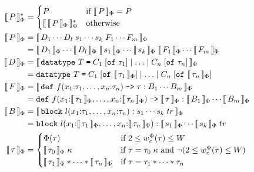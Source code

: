 \begin{figure}[htbp]
  \centering
  \footnotesize
  \setlength{\abovedisplayskip}{2pt}
  \setlength{\belowdisplayskip}{2pt}
  \setlength{\jot}{2pt}
  \[
  \begin{aligned}
    \sembrack{P}_\Phi^*
      &= \begin{cases}
           P & \text{if } \sembrack{P}_\Phi = P \\
           \sembrack{\sembrack{P}_\Phi}_\Phi^* & \text{otherwise}
         \end{cases} \\
    \sembrack{P}_\Phi
      &= \sembrack{D_1 \cdots D_l \; s_1 \cdots s_k \; F_1 \cdots F_m}_\Phi \\
      &= \sembrack{D_1}_\Phi \cdots \sembrack{D_l}_\Phi \; \sembrack{s_1}_\Phi \cdots \sembrack{s_k}_\Phi \; \sembrack{F_1}_\Phi \cdots \sembrack{F_m}_\Phi \\
    \sembrack{D}_\Phi
      &= \sembrack{\mathtt{datatype}\ T \syneq C_1\;[\mathtt{of}\ \tau_1] \mathrel{\mathtt{|}} \dots \mathrel{\mathtt{|}} C_n\;[\mathtt{of}\ \tau_n]}_\Phi \\
      &= \mathtt{datatype}\ T \syneq C_1\;[\mathtt{of}\ \sembrack{\tau_1}_\Phi] \mathrel{\mathtt{|}} \dots \mathrel{\mathtt{|}} C_n\;[\mathtt{of}\ \sembrack{\tau_n}_\Phi] \\
    \sembrack{F}_\Phi
      &= \sembrack{\mathtt{def}\ f(x_1{:}\tau_1, \dots, x_n{:}\tau_n) \mathrel{\texttt{->}} \tau : B_1 \cdots B_m}_\Phi \\
      &= \mathtt{def}\ f(x_1{:}\sembrack{\tau_1}_\Phi, \dots, x_n{:}\sembrack{\tau_n}_\Phi) \mathrel{\texttt{->}} \sembrack{\tau}_\Phi : \sembrack{B_1}_\Phi \cdots \sembrack{B_m}_\Phi \\
    \sembrack{B}_\Phi
      &= \sembrack{\mathtt{block}\ l(x_1{:}\tau_1, \dots, x_n{:}\tau_n) : s_1 \cdots s_k \; tr}_\Phi \\
      &= \mathtt{block}\ l(x_1{:}\sembrack{\tau_1}_\Phi, \dots, x_n{:}\sembrack{\tau_n}_\Phi) : \sembrack{s_1}_\Phi \cdots \sembrack{s_k}_\Phi \; tr \\
    \sembrack{\tau}_\Phi
      &= \begin{cases}
           \Phi(\tau) & \text{if } 2 \le w_c^\Phi(\tau) \le W \\
           \sembrack{\tau_0}_\Phi\;\kappa & \text{if } \tau = \tau_0\;\kappa \text{ and } \neg(2 \le w_c^\Phi(\tau) \le W) \\
           \sembrack{\tau_1}_\Phi * \cdots * \sembrack{\tau_n}_\Phi & \text{if } \tau = \tau_1 * \cdots * \tau_n \\

\end{cases}
\end{aligned}\]
\end{figure}
